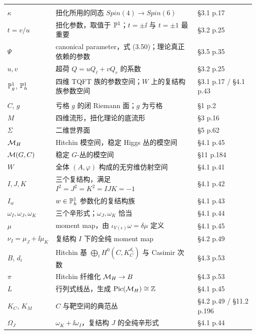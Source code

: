 \begin{longtable}{@{}>{\raggedright\arraybackslash}p{3.15cm}>{\raggedright\arraybackslash}p{9.05cm}>{\raggedright\arraybackslash}p{3.1cm}@{}}
\addlinespace[3pt]
\multicolumn{3}{@{}l}{\tabhead{扭化与参数}}\\
\addlinespace[1pt]
$\kappa$ & 扭化所用的同态 $Spin(4)\to Spin(6)$ & \S3.1 p.17 \\
\addlinespace[1pt]
$t=v/u$ & 扭化参数，取值于 $\mathbb{P}^1$；$t=\pm\ii$ 与 $t=\pm1$ 最重要 & \S3.2 p.25 \\
\addlinespace[1pt]
$\Psi$ & canonical parameter，式 (3.50)；理论真正依赖的参数 & \S3.5 p.35 \\
\addlinespace[1pt]
$u,v$ & 超荷 $Q=uQ_\ell+vQ_r$ 的系数 & \S3.2 p.25 \\
\addlinespace[1pt]
$\mathbb{P}^1_g$, $\mathbb{P}^1_h$ & 四维 TQFT 族的参数空间；$W$ 上的复结构族参数空间 & \S3.1 p.17 / \S4.1 p.43 \\

\addlinespace[3pt]
\multicolumn{3}{@{}l}{\tabhead{几何：$C$、$M$ 与 $\MH$}}\\
\addlinespace[1pt]
$C$, $g$ & 亏格 $g$ 的闭 Riemann 面；$g$ 为亏格 & \S1 p.2 \\
\addlinespace[1pt]
$M$ & 四维流形，扭化理论的底流形 & \S3 p.16 \\
\addlinespace[1pt]
$\Sigma$ & 二维世界面 & \S5 p.62 \\
\addlinespace[1pt]
$\MH$ & Hitchin 模空间，稳定 Higgs 丛的模空间 & \S4.1 p.45 \\
\addlinespace[1pt]
$\mathcal{M}(G,C)$ & 稳定 $G$-丛的模空间 & \S11 p.184 \\
\addlinespace[1pt]
$W$ & 全体 $(A,\varphi)$ 构成的无穷维仿射空间 & \S4.1 p.41 \\
\addlinespace[1pt]
$I,J,K$ & 三个复结构，满足 $I^2=J^2=K^2=IJK=-1$ & \S4.1 p.42 \\
\addlinespace[1pt]
$I_w$ & $w\in\mathbb{P}^1_h$ 参数化的复结构族 & \S4.1 p.43 \\
\addlinespace[1pt]
$\omega_I,\omega_J,\omega_K$ & 三个辛形式；$\omega_J,\omega_K$ 恰当 & \S4.1 p.44 \\
\addlinespace[1pt]
$\mu$ & moment map，由 $\iota_{V(\epsilon)}\omega=\delta\mu$ 定义 & \S4.1 p.45 \\
\addlinespace[1pt]
$\nu_I=\mu_J+\ii\mu_K$ & 复结构 $I$ 下的全纯 moment map & \S4.2 p.49 \\
\addlinespace[1pt]
$B$, $d_i$ & Hitchin 基 $\bigoplus_iH^0(C,K_C^{d_i})$ 与 Casimir 次数 & \S4.3 p.53 \\
\addlinespace[1pt]
$\pi$ & Hitchin 纤维化 $\mathcal{M}_H\to B$ & \S4.3 p.53 \\
\addlinespace[1pt]
$L$ & 行列式线丛，生成 $\mathrm{Pic}(\mathcal{M}_H)\cong\mathbb{Z}$ & \S4.1 p.45 \\
\addlinespace[1pt]
$K_C$, $K_M$ & $C$ 与靶空间的典范丛 & \S4.2 p.49 / \S11.2 p.196 \\
\addlinespace[1pt]
$\Omega_J$ & $\omega_K+\ii\omega_I$，复结构 $J$ 的全纯辛形式 & \S4.1 p.44 \\


\end{longtable}
